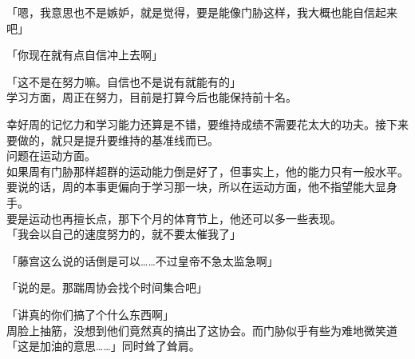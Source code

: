 「嗯，我意思也不是嫉妒，就是觉得，要是能像门胁这样，我大概也能自信起来吧」

「你现在就有点自信冲上去啊」

「这不是在努力嘛。自信也不是说有就能有的」\\

学习方面，周正在努力，目前是打算今后也能保持前十名。

幸好周的记忆力和学习能力还算是不错，要维持成绩不需要花太大的功夫。接下来要做的，就只是提升要维持的基准线而已。\\

问题在运动方面。\\

如果周有门胁那样超群的运动能力倒是好了，但事实上，他的能力只有一般水平。要说的话，周的本事更偏向于学习那一块，所以在运动方面，他不指望能大显身手。\\

要是运动也再擅长点，那下个月的体育节上，他还可以多一些表现。\\

「我会以自己的速度努力的，就不要太催我了」

「藤宫这么说的话倒是可以……不过皇帝不急太监急啊」

「说的是。那踹周协会找个时间集合吧」

「讲真的你们搞了个什么东西啊」\\

周脸上抽筋，没想到他们竟然真的搞出了这协会。而门胁似乎有些为难地微笑道「这是加油的意思……」同时耸了耸肩。
